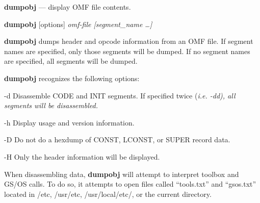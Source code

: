 \documentclass{article}
\def\dumpobj{\textbf{dumpobj} }
\begin{document}
\dumpobj --- display OMF file contents.

\dumpobj [options] \it{omf-file} [\it{segment\_name \dots}]


\dumpobj dumps header and opcode information from an OMF file.  If segment names are specified, 
only those segments will be dumped.  If no segment names are specified, all segments will be dumped.


\dumpobj recognizes the following options:
\begin{optionlist}
	\item [-d]
	Disassemble CODE and INIT segments.  If specified twice (\it{i.e.} -dd), all segments will
	be disassembled.
	\item [-h]
	Display usage and version information.
	\item[-D]
	Do not do a hexdump of CONST, LCONST, or SUPER record data.
	\item[-H]
	Only the header information will be displayed.
	
\end{optionlist}


When disassembling data, \dumpobj will attempt to interpret toolbox and GS/OS calls.  To do so, it attempts to open files called ``tools.txt'' and ``gsos.txt'' located in /etc, /usr/etc, /usr/local/etc/, or the current directory.
\end{document}

